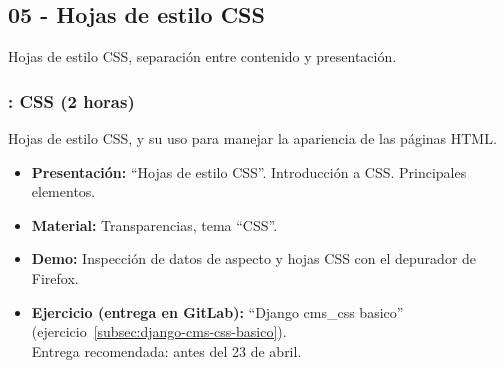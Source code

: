 \documentclass[a4paper,12pt]{article}
\begin{document}
%
%
%
%
\subsection{05 - Hojas de estilo CSS}

Hojas de estilo CSS, separación entre contenido y presentación.

\subsubsection{\juevesK: CSS (2 horas)}
\label{cal:juevesK}

Hojas de estilo CSS, y su uso para manejar la apariencia de las páginas HTML.

\begin{itemize}
\item \textbf{Presentación:} ``Hojas de estilo CSS''. Introducción a CSS. Principales elementos.
 \item \textbf{Material:} Transparencias, tema ``CSS''.
\item \textbf{Demo:} Inspección de datos de aspecto y hojas CSS con el depurador de Firefox.
\item \textbf{Ejercicio (entrega en GitLab):} ``Django cms\_css basico'' (ejercicio~\ref{subsec:django-cms-css-basico}). \\
  Entrega recomendada: antes del 23 de abril.
\end{itemize}
\end{document}
